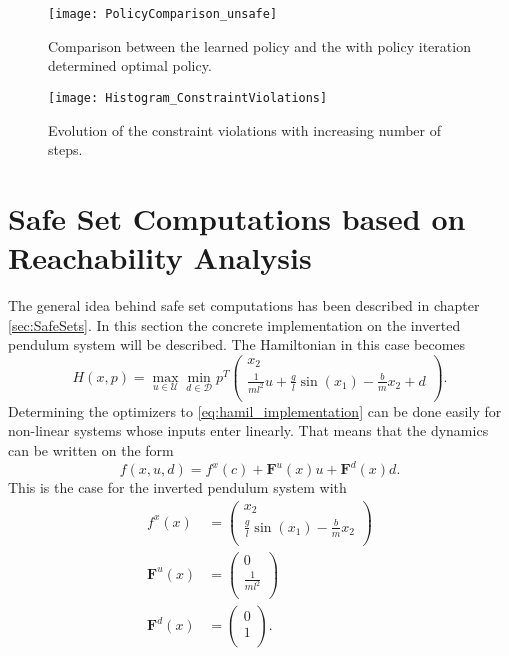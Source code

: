 \documentclass[../main.tex]{subfiles}
\begin{document}
\begin{figure}[H]
    \centering
    \texttt{[image: PolicyComparison\_unsafe]}
        \caption{Comparison between the learned policy and the with policy iteration determined optimal policy.}    
    \label{fig:PolicyComparison_unsafe}
\end{figure}
\begin{figure}[H]
    \centering
    \texttt{[image: Histogram\_ConstraintViolations]}
        \caption{Evolution of the constraint violations with increasing number of steps.}    
    \label{fig:Histogram_ConstraintViolations}
\end{figure}

\section{Safe Set Computations based on Reachability Analysis}
The general idea behind safe set computations has been described in chapter \ref{sec:SafeSets}. In this section the concrete implementation on the inverted pendulum system will be described. The Hamiltonian in this case becomes 
\begin{equation}\label{eq:hamil_implementation}
    H(x,p) = \max_{u \in \mathcal{U}} \min_{d \in \mathcal{D}} p^T 
\left(
\begin{array}{c}
x_2\\
\frac{1}{ml^2}u+\frac{g}{l}\sin(x_1)-\frac{b}{m}x_2+d\\
\end{array}
\right).
\end{equation}
Determining the optimizers to \eqref{eq:hamil_implementation} can be done easily for non-linear systems whose inputs enter linearly. That means that the dynamics can be written on the form
\begin{equation}
    f(x,u,d) = f^x(c)+\textbf{F}^u(x)u+\textbf{F}^d(x)d.
\end{equation}
This is the case for the inverted pendulum system with
\begin{align}
    f^x(x) &= \left(
\begin{array}{c}
x_2\\
\frac{g}{l}\sin(x_1)-\frac{b}{m}x_2\\
\end{array}
\right)\\
    \textbf{F}^u(x) &= \left(
\begin{array}{c}
0\\
\frac{1}{ml^2}\\
\end{array}
\right)\\
    \textbf{F}^d(x) &= \left(
    \begin{array}{c}
0\\
1\\
\end{array}
\right).
\end{align}
\end{document}
